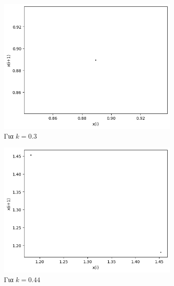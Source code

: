 \begin{figure}[ht]
	\centering	
	\begin{subfigure}[b]{0.4\textwidth}
		\centering
		\includegraphics[width=\textwidth]{LateX images/graphs q03/g3}
		\caption{Για $k=0.3$}
		\label{f:k15}
	\end{subfigure}
	\hfill
	\begin{subfigure}[b]{0.4\textwidth}
		\centering
		\includegraphics[width=\textwidth]{LateX images/graphs q03/g4}
		\caption{Για $k=0.44$}
		\label{f:k16}
	\end{subfigure}
	\hfill
	\begin{subfigure}[b]{0.4\textwidth}
		\centering

\end{subfigure}
\end{figure}
